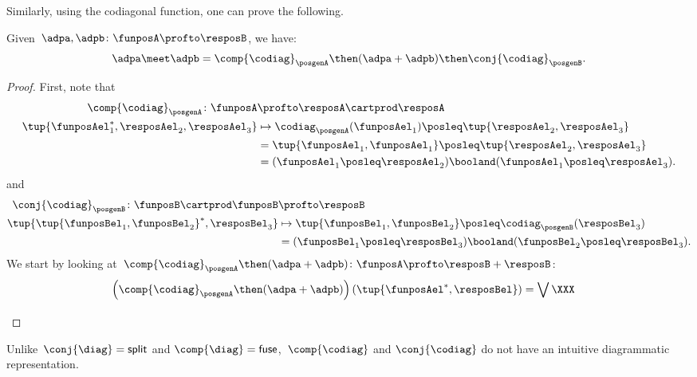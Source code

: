Similarly, using the codiagonal function, one can prove the following.
\begin{lemma}
    Given~$\adpa, \adpb\colon \funposA \profto \resposB$, we have:
    \begin{equation}
        \adpa \meet \adpb = \comp{\codiag}_\posgenA \then(\adpa + \adpb) \then \conj{\codiag}_\posgenB.
    \end{equation}
\end{lemma}
\begin{proof}
    First, note that
    \begin{equation}
        \begin{aligned}
            \comp{\codiag}_\posgenA \colon \funposA&\profto \resposA\cartprod \resposA\\
            \tup{\funposAel_1^*,\resposAel_2,\resposAel_3}&\mapsto \codiag_\posgenA(\funposAel_1)\posleq \tup{\resposAel_2,\resposAel_3}\\
            &= \tup{\funposAel_1,\funposAel_1}\posleq \tup{\resposAel_2,\resposAel_3}\\
            &= (\funposAel_1\posleq \resposAel_2) \booland (\funposAel_1\posleq \resposAel_3).
        \end{aligned}
    \end{equation}
    and
    \begin{equation}
        \begin{aligned}
            \conj{\codiag}_\posgenB \colon \funposB\cartprod \funposB&\profto \resposB\\
            \tup{\tup{\funposBel_1,\funposBel_2}^*,\resposBel_3}&\mapsto \tup{\funposBel_1,\funposBel_2}\posleq \codiag_\posgenB(\resposBel_3)\\
            &= (\funposBel_1\posleq \resposBel_3) \booland (\funposBel_2\posleq \resposBel_3).
        \end{aligned}
    \end{equation}
    We start by looking at~$\comp{\codiag}_\posgenA \then (\adpa+\adpb) \colon \funposA\profto \resposB+\resposB$:
    \begin{equation}
        \begin{aligned}
            \left(\comp{\codiag}_\posgenA\then (\adpa+\adpb)\right)\left(\tup{\funposAel^*,\resposBel}\right)&=\bigvee_{} \XXX
        \end{aligned}
    \end{equation}
\end{proof}
Unlike~$\conj{\diag} = \mathsf{split}$ and $\comp{\diag} = \mathsf{fuse}$,~$\comp{\codiag}$ and $\conj{\codiag}$ do not have an intuitive diagrammatic representation.
